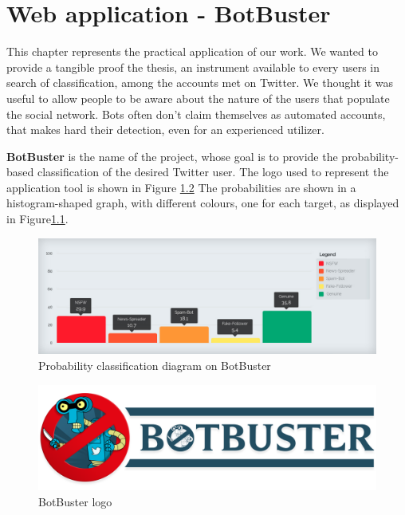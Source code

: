 \chapter{Web application - BotBuster}
\label{capitolo6}
\thispagestyle{empty}
This chapter represents the practical application of our work. We wanted to provide a tangible proof the thesis, an instrument available to every users in search of classification, among the accounts met on Twitter.
We thought it was useful to allow people to be aware about the nature of the users that populate the social network.
Bots often don't claim themselves as automated accounts, that makes hard their detection, even for an experienced utilizer.


\textbf{BotBuster} is the name of the project, whose goal is to provide the probability-based classification of the desired Twitter user.
The logo used to represent the application tool is shown in Figure \ref{fig:botbuster}
The probabilities are shown in a histogram-shaped graph, with different colours, one for each target, as displayed in Figure\ref{fig:histogram}.

\begin{figure}
	\begin{center}
		\includegraphics[width=\columnwidth]{chapter7/figure/histogram.jpg}\par 
	\end{center}
	\caption{Probability classification diagram on BotBuster}
	\label{fig:histogram}
\end{figure}

\begin{figure}
	\begin{center}
		\includegraphics[width=\columnwidth]{chapter7/figure/logo.png}\par 
	\end{center}
	\caption{BotBuster logo}
	\label{fig:botbuster}
\end{figure}

